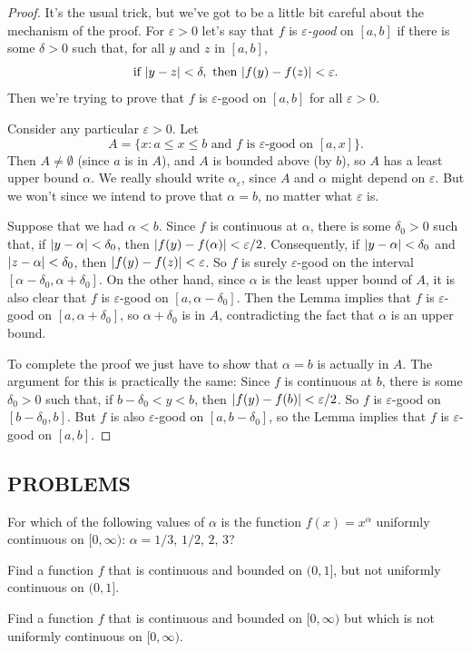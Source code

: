 \begin{proof}
It's the usual trick, but we've got to be a little bit careful about the
mechanism of the proof. For $\varepsilon > 0$ let's say that $f$ is
\emph{$\varepsilon$-good} on $[a,b]$ if there is some $\delta > 0$ such that,
for all $y$ and $z$ in $[a,b]$,
\[
\text{if }\lvert y - z\rvert < \delta,\text{ then }\lvert f(y) - f(z)\rvert < \varepsilon.
\]
Then we're trying to prove that $f$ is $\varepsilon$-good on $[a,b]$ for all
$\varepsilon > 0$.

Consider any particular $\varepsilon > 0$. Let
\[
A = \{x : a \leq x \leq b\text{ and $f$ is $\varepsilon$-good on $[a,x]$}\}.
\]
Then $A \neq \emptyset$ (since $a$ is in $A$), and $A$ is bounded above (by
$b$), so $A$ has a least upper bound $\alpha$. We really should write
$\alpha_{\varepsilon}$, since $A$ and $\alpha$ might depend on $\varepsilon$.
But we won't since we intend to prove that $\alpha = b$, no matter what
$\varepsilon$ is.

Suppose that we had $\alpha < b$. Since $f$ is continuous at $\alpha$, there
is some $\delta_0 > 0$ such that, if $\lvert y - \alpha\rvert < \delta_0$, then
$\lvert f(y) - f(\alpha)\rvert < \varepsilon/2$. Consequently, if
$\lvert y - \alpha\rvert < \delta_0$ and $\lvert z - \alpha\rvert < \delta_0$, then
$\lvert f(y) - f(z)\rvert < \varepsilon$. So $f$ is surely $\varepsilon$-good on the
interval $[\alpha - \delta_0, \alpha + \delta_0]$. On the other hand, since
$\alpha$ is the least upper bound of $A$, it is also clear that $f$ is
$\varepsilon$-good on $[a, \alpha - \delta_0]$. Then the Lemma implies that
$f$ is $\varepsilon$-good on $[a, \alpha + \delta_0]$, so $\alpha + \delta_0$
is in $A$, contradicting the fact that $\alpha$ is an upper bound.

To complete the proof we just have to show that $\alpha = b$ is actually in
$A$. The argument for this is practically the same: Since $f$ is continuous
at $b$, there is some $\delta_0 > 0$ such that, if $b - \delta_0 < y < b$,
then $\lvert f(y) - f(b)\rvert < \varepsilon/2$. So $f$ is $\varepsilon$-good on
$[b - \delta_0, b]$. But $f$ is also $\varepsilon$-good on
$[a, b - \delta_0]$, so the Lemma implies that $f$ is $\varepsilon$-good on
$[a,b]$.
\end{proof}

\subsection*{PROBLEMS}

\begin{letters}
\item For which of the following values of $\alpha$ is the function
  $f(x) = x^{\alpha}$ uniformly continuous on $[0,\infty)$:
  $\alpha = 1/3$, $1/2$, $2$, $3$?
\item Find a function $f$ that is continuous and bounded on $(0,1]$, but not
  uniformly continuous on $(0,1]$.
\item Find a function $f$ that is continuous and bounded on $[0,\infty)$ but
  which is not uniformly continuous on $[0,\infty)$.
\end{letters}

